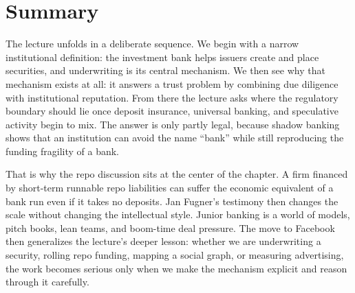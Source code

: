 \section{Summary}

The lecture unfolds in a deliberate sequence. We begin with a narrow institutional definition: the investment bank helps issuers create and place securities, and underwriting is its central mechanism. We then see why that mechanism exists at all: it answers a trust problem by combining due diligence with institutional reputation. From there the lecture asks where the regulatory boundary should lie once deposit insurance, universal banking, and speculative activity begin to mix. The answer is only partly legal, because shadow banking shows that an institution can avoid the name ``bank'' while still reproducing the funding fragility of a bank.

That is why the repo discussion sits at the center of the chapter. A firm financed by short-term runnable repo liabilities can suffer the economic equivalent of a bank run even if it takes no deposits. Jan Fugner's testimony then changes the scale without changing the intellectual style. Junior banking is a world of models, pitch books, lean teams, and boom-time deal pressure. The move to Facebook then generalizes the lecture's deeper lesson: whether we are underwriting a security, rolling repo funding, mapping a social graph, or measuring advertising, the work becomes serious only when we make the mechanism explicit and reason through it carefully.